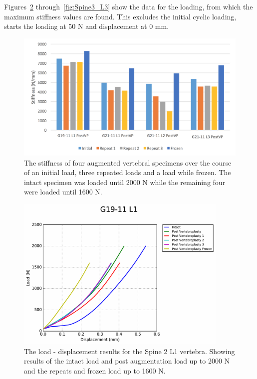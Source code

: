 Figures~\ref{fig:Spine2_L1} through~\ref{fig:Spine3_L3} show the data for the
loading, from which the maximum stiffness values are found. This excludes the
initial cyclic loading, starts the loading at 50 N and displacement at 0 mm.

\begin{figure}[!h]
  \centering
  \includegraphics[width=6in]{Chapters/Chapter_HT_images/experimental_repeats.png}
  \caption{The stiffness of four augmented vertebral specimens over the course
    of an initial load, three repeated loads and a load while frozen. The intact
    specimen was loaded until 2000 N while the remaining four were loaded until
    1600 N.}
  \label{fig:exp_repeats}
\end{figure}


\begin{figure}[ht!]
  \centering
  \includegraphics[width=4in]{Chapters/Chapter_HT_images/G19-11_L1.pdf}
  \caption{The load - displacement results for the Spine 2 L1 vertebra. Showing
    results of the intact load and post augmentation load up to 2000 N and the
    repeats and frozen load up to 1600 N.}
  \label{fig:Spine2_L1}
\end{figure}

